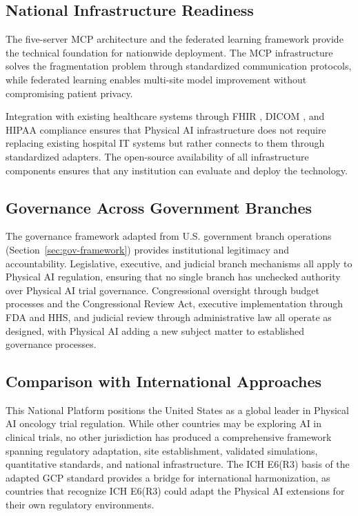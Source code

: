 \subsection{National Infrastructure Readiness}
\label{subsec:discuss-infrastructure}

The five-server MCP architecture \cite{national-mcp-paper} and the federated
learning framework \cite{fl-paper} provide the technical foundation for
nationwide deployment. The MCP infrastructure solves the fragmentation problem
through standardized communication protocols, while federated learning enables
multi-site model improvement without compromising patient privacy.

Integration with existing healthcare systems through FHIR \cite{hl7-fhir},
DICOM \cite{dicom}, and HIPAA \cite{hipaa} compliance ensures that Physical AI
infrastructure does not require replacing existing hospital IT systems but
rather connects to them through standardized adapters. The open-source
availability of all infrastructure components \cite{main-repo, mcp-repo,
fl-repo} ensures that any institution can evaluate and deploy the technology.

\subsection{Governance Across Government Branches}
\label{subsec:discuss-governance}

The governance framework adapted from U.S. government branch operations
(Section~\ref{sec:gov-framework}) provides institutional legitimacy and
accountability. Legislative, executive, and judicial branch mechanisms all apply
to Physical AI regulation, ensuring that no single branch has unchecked
authority over Physical AI trial governance. Congressional oversight through
budget processes and the Congressional Review Act, executive implementation
through FDA and HHS, and judicial review through administrative law all operate
as designed, with Physical AI adding a new subject matter to established
governance processes.

\subsection{Comparison with International Approaches}
\label{subsec:discuss-international}

This National Platform positions the United States as a global leader in
Physical AI oncology trial regulation. While other countries may be exploring
AI in clinical trials, no other jurisdiction has produced a comprehensive
framework spanning regulatory adaptation, site establishment, validated
simulations, quantitative standards, and national infrastructure. The ICH
E6(R3) \cite{ich-e6r3} basis of the adapted GCP standard provides a
bridge for international harmonization, as countries that recognize ICH E6(R3)
could adapt the Physical AI extensions for their own regulatory environments.

